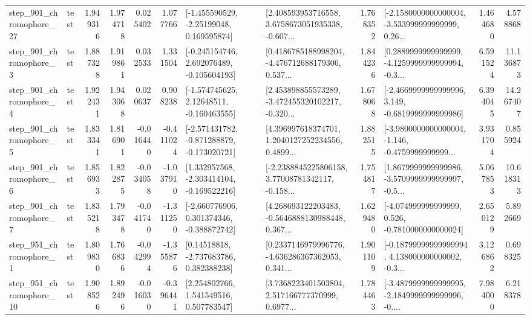 \begin{tabular}{llrrrrllrlrr}
  step\_901\_chromophore\_27 &      test &      1.949316 &    1.974718 &      0.025402 &  1.077766 &    [-1.455590529, -2.25199048, 0.169595874] &  [2.408593953716558, 3.6758673051935338, -0.607... &       1.768352 &  [-2.1580000000000004, -3.533999999999999, 0.26... &            1.464680 &          4.578868 \\
   step\_901\_chromophore\_3 &      test &      1.887328 &    1.919861 &      0.032533 &  1.331504 &   [-0.245154746, 2.692076489, -0.105604193] &  [0.4186785188998204, -4.476712688179306, 0.537... &       1.844236 &  [0.2889999999999999, -4.1259999999999994, -0.3... &            6.591524 &         11.136873 \\
   step\_901\_chromophore\_4 &      test &      1.922431 &    1.943068 &      0.020637 &  0.908238 &    [-1.574745625, 2.12648511, -0.160463555] &  [2.453898855573289, -3.472455320102217, -0.320... &       1.678068 &  [-2.4669999999999996, 3.149, -0.6819999999999986] &            6.394045 &         14.267407 \\
   step\_901\_chromophore\_5 &      test &      1.833341 &    1.816901 &     -0.016440 & -0.411024 &  [-2.571431782, -0.871288879, -0.173020721] &  [4.396997618374701, 1.2040127252234556, 0.4899... &       1.882515 &  [-3.9800000000000004, -1.146, -0.4759999999999... &            3.931704 &          0.855924 \\
   step\_901\_chromophore\_6 &      test &      1.856933 &    1.822875 &     -0.034058 & -1.037910 &   [1.332957568, -2.303414104, -0.169522216] &  [-2.2388845225806158, 3.77008781342117, -0.158... &       1.754817 &  [1.8679999999999986, -3.5709999999999997, -0.5... &            5.067853 &         10.618313 \\
   step\_901\_chromophore\_7 &      test &      1.835218 &    1.793478 &     -0.041740 & -1.311250 &   [-2.660776906, 0.301374346, -0.388872742] &  [4.268693122203483, -0.5646888130988448, 0.367... &       1.629480 &   [-4.074999999999999, 0.526, -0.7810000000000024] &            2.650129 &          5.892669 \\
   step\_951\_chromophore\_1 &      test &      1.809830 &    1.766836 &     -0.042994 & -1.355876 &     [0.14518818, -2.737683786, 0.382388238] &  [0.2337146979996776, -4.636286367362053, 0.341... &       1.901109 &  [-0.18799999999999994, 4.138000000000002, -0.3... &            3.126862 &          0.698325 \\
  step\_951\_chromophore\_10 &      test &      1.908526 &    1.892496 &     -0.016030 & -0.396441 &     [2.254802766, 1.541549516, 0.507783547] &  [3.7368223401503804, 2.517166777370999, 0.6977... &       1.784463 &  [-3.4879999999999995, -2.1849999999999996, -0.... &            7.984000 &          6.218378 \\

\end{tabular}
